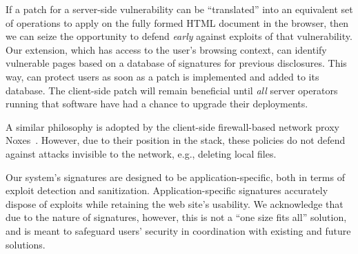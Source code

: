 If a patch for a server-side vulnerability can be ``translated'' into
an equivalent set of operations to apply on the fully formed HTML
document in the browser, then we can seize the opportunity to defend
{\em early} against exploits of that vulnerability.
%
Our extension, which has access to the user's browsing context, can
identify vulnerable pages based on a database of signatures for
previous disclosures. This way, \sys can protect users as soon as a patch
is implemented and added to its database. The client-side
patch will remain beneficial until \textit{all} server
operators running that software have had a chance to upgrade their
deployments. 


A similar philosophy is adopted by the client-side firewall-based network 
proxy Noxes~\cite{Kirda:2009:CCS:2639535.2639808}. 
However, due to their position in the stack, these policies do not defend against 
attacks invisible to the network, e.g., deleting local files.

Our system's signatures are designed to be application-specific, both
in terms of exploit detection and sanitization. %
Application-specific signatures accurately dispose
of exploits while retaining the web site's usability. We acknowledge that due to the nature of signatures,
however, this is not a ``one size fits all'' solution, and is meant to
safeguard users' security in coordination with existing
and future solutions.



